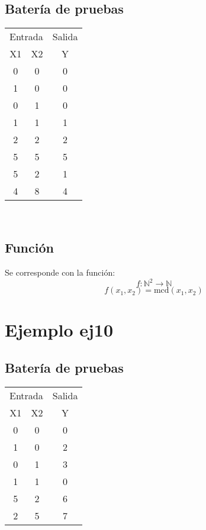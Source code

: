 \documentclass[a4paper]{article}
\begin{document}
  			\subsection{Batería de pruebas}
  			\begin{center}
  				\begin{tabular}{|c|c|c|} \hline
  					\multicolumn{2}{|l|}{Entrada}&\multicolumn{1}{l|}{Salida}\\
  				X1 & X2 & Y \\
  					\hline
  				0 & 0 & 0 \\
  				1 & 0 & 0 \\
  				0 & 1 & 0 \\
  				1 & 1 & 1 \\
  				2 & 2 & 2 \\
  				5 & 5 & 5 \\
  				5 & 2 & 1 \\
  				4 & 8 & 4 \\
  					\hline
  				\end{tabular}\\
  			\end{center}
  			\subsection{Función}
  				Se corresponde con la función:
  				$$f:\mathbb{N}^2 \longrightarrow \mathbb{N}$$
  				\begin{equation*}
  					f(x_1, x_2) = \mathrm{mcd}(x_1,x_2)
  				\end{equation*}

  		 \section{Ejemplo ej10}
  		 	\subsection{Batería de pruebas}
  		 	\begin{center}
  		 		\begin{tabular}{|c|c|c|} \hline
  		 			\multicolumn{2}{|l|}{Entrada}&\multicolumn{1}{l|}{Salida}\\
  		 		X1 & X2 & Y \\
  		 			\hline
  		 		0 & 0 & 0 \\
  		 		1 & 0 & 2 \\
  		 		0 & 1 & 3 \\
  		 		1 & 1 & 0 \\
  		 		5 & 2 & 6 \\
  		 		2 & 5 & 7 \\
  		 			\hline
  		 		\end{tabular}\\
  		 	\end{center}
\end{document}

